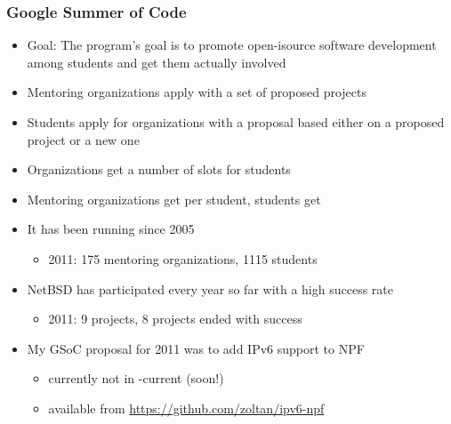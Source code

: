 \documentclass[magyar]{beamer}
\begin{document}
\begin{frame}
\frametitle{Google Summer of Code}
\begin{itemize}
	\item Goal: The program's goal is to promote open-isource software development among students and get them actually involved
\pause
	\item Mentoring organizations apply with a set of proposed projects
\pause
	\item Students apply for organizations with a proposal based either on a proposed project or a new one
\pause
	\item Organizations get a number of slots for students
\pause
	\item Mentoring organizations get  per student, students get 
\pause
	\item It has been running since 2005
		\begin{itemize}
			\item 2011: 175 mentoring organizations, 1115 students
		\end{itemize}
	\item NetBSD has participated every year so far with a high success rate
		\begin{itemize}
			\item 2011: 9 projects, 8 projects ended with success
		\end{itemize}
	\item My GSoC proposal for 2011 was to add IPv6 support to NPF
		\begin{itemize}
			\item currently not in -current (soon!)
			\item available from \url{https://github.com/zoltan/ipv6-npf}
		\end{itemize}
\end{itemize}
\end{frame}
\end{document}
